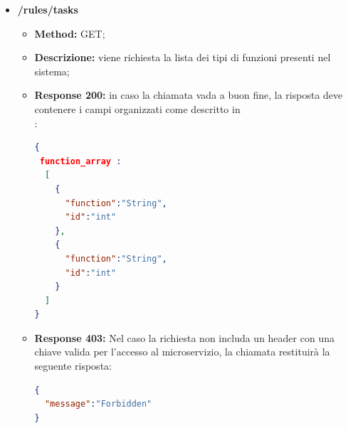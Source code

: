 \begin{itemize}
\begin{itemize}
\item \textbf{Response 200:} Nel caso la richiesta vada a buon fine, la chiamata restituirà la seguente risposta:
\begin{lstlisting}[language=json,firstnumber=1]
{
  "message":"success"
}
\end{lstlisting}
\item \textbf{Response 404:} Nel caso la richiesta fatta non rispetti il formato sopra descritto, la chiamata restituirà la seguente risposta:
\begin{lstlisting}[language=json,firstnumber=1]
{
  "message":"Not found"
}
\end{lstlisting}
\item \textbf{Response 500:} Nel caso si verifichino degli errori durante il tentativo di soddisfare la richiesta, la chiamata restituirà la seguente risposta:
\begin{lstlisting}[language=json,firstnumber=1]
{
  "message":"Messaggio relativo all'errore"
}
\end{lstlisting}\end{itemize}


\item \textbf{/rules/tasks}\\

\begin{itemize}
\item \textbf{Method:} GET;
\item \textbf{Descrizione:} viene richiesta la lista dei tipi di funzioni presenti nel sistema;
\item \textbf{Response 200:} in caso la chiamata vada a buon fine, la risposta deve contenere i campi organizzati come descritto in \\:
\begin{lstlisting}[language=json,firstnumber=1]
{
 function_array :
  [
    {
      "function":"String",
      "id":"int"
    },
    {
      "function":"String",
      "id":"int"
    }
  ]
}
\end{lstlisting}
\item \textbf{Response 403:} Nel caso la richiesta non includa un header  con una chiave valida per l'accesso al microservizio, la chiamata restituirà la seguente risposta:
\begin{lstlisting}[language=json,firstnumber=1]
{
  "message":"Forbidden"
}
\end{lstlisting}


\end{itemize}
\end{itemize}

